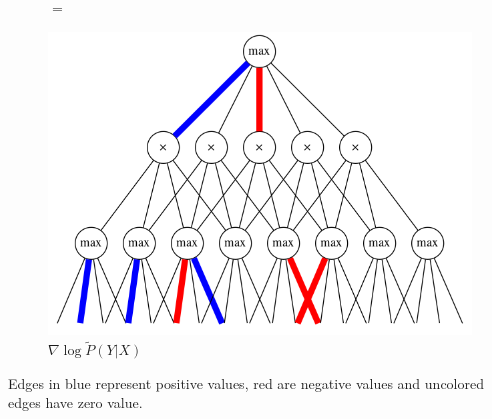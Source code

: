\documentclass[usenames,dvipsnames]{beamer}
\newcommand{\ddspn}[2]{\frac{\partial#1}{\partial#2}}
\begin{document}
\begin{frame}
\begin{figure}[h]
\begin{minipage}{0.3\textwidth}
      \caption*{$\ddspn{}{W}\log M(X)$}
    \end{minipage}
    $=$
    \begin{minipage}{0.3\textwidth}
      \includegraphics[width=\linewidth]{imgs/hard_diff_2.png}
      \captionsetup{justification=centering}
      \caption*{$\nabla\log\tilde{P}(Y|X)$}
    \end{minipage}
  \end{figure}

  Edges in blue represent positive values, red are negative values and uncolored edges have zero
  value.
\end{frame}
\end{document}
